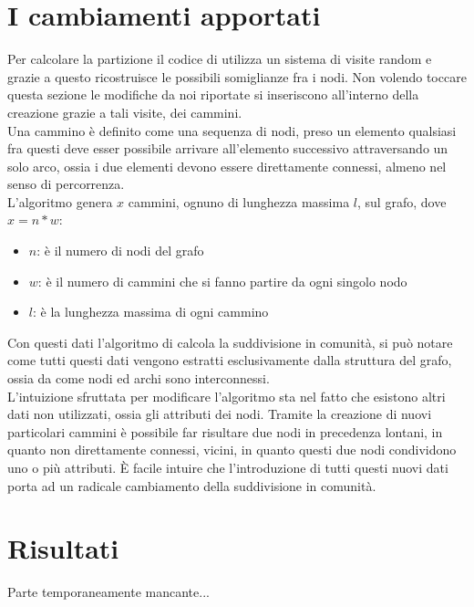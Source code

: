 \section{I cambiamenti apportati}
Per calcolare la partizione il codice di \cnrl utilizza un sistema di visite random e grazie a questo ricostruisce le possibili somiglianze fra i nodi. Non volendo toccare questa sezione le modifiche da noi riportate si inseriscono all'interno della creazione grazie a tali visite, dei cammini.\\
Una cammino è definito come una sequenza di nodi, preso un elemento qualsiasi fra questi deve esser possibile arrivare all'elemento successivo attraversando un solo arco, ossia i due elementi devono essere direttamente connessi, almeno nel senso di percorrenza.\\
L'algoritmo genera $x$ cammini, ognuno di lunghezza massima $l$, sul grafo, dove $x=n*w$:
\begin{itemize}
	\item $n$: è il numero di nodi del grafo
	\item $w$: è il numero di cammini che si fanno partire da ogni singolo nodo
	\item $l$: è la lunghezza massima di ogni cammino
\end{itemize}
%
Con questi dati l'algoritmo di \cnrl calcola la suddivisione in comunità, si può notare come tutti questi dati vengono estratti esclusivamente dalla struttura del grafo, ossia da come nodi ed archi sono interconnessi.\\
L'intuizione sfruttata per modificare l'algoritmo sta nel fatto che esistono altri dati non utilizzati, ossia gli attributi dei nodi. Tramite la creazione di nuovi particolari cammini è possibile far risultare due nodi in precedenza lontani, in quanto non direttamente connessi, vicini, in quanto questi due nodi condividono uno o più attributi. È facile intuire che l'introduzione di tutti questi nuovi dati porta ad un radicale cambiamento della suddivisione in comunità.
%
\section{Risultati}
Parte temporaneamente mancante...

%
%
%
%
\newpage
%
